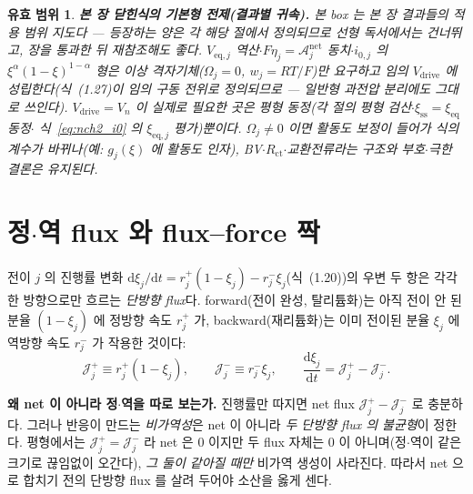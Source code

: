 \documentclass[11pt,a4paper]{article}
\newtheorem*{boundbox}{유효 범위}
\newcommand{\dd}{\mathrm{d}}
\newcommand{\eq}{\mathrm{eq}}
\newcommand{\drive}{\mathrm{drive}}
\newcommand{\sstat}{\mathrm{ss}}
\newcommand{\ct}{\mathrm{ct}}
\begin{document}
\begin{boundbox}
\textbf{본 장 닫힌식의 기본형 전제(결과별 귀속).} 본 box 는 본 장 결과들의 적용 범위 \emph{지도}다 — 등장하는
양은 각 해당 절에서 정의되므로 선형 독서에서는 건너뛰고, 장을 통과한 뒤 재참조해도 좋다. $V_{\eq,j}$ 역산$\cdot$$F\eta_j=\mathcal A_j^{\mathrm{net}}$ 동치$\cdot$$i_{0,j}$ 의 $\xi^{\alpha}(1-\xi)^{1-\alpha}$ 형은 \emph{이상 격자기체}($\Omega_j=0$, $w_j=RT/F$)만 요구하고 임의
$V_\drive$ 에 성립한다(식~(1.27)이 임의 구동 전위로 정의되므로 — 일반형 과전압 분리에도 그대로 쓰인다).
$V_\drive=V_n$ 이 실제로 필요한 곳은 \emph{평형 동정}(각 절의 평형 검산$\cdot$$\xi_\sstat=\xi_{\eq}$ 동정$\cdot$
식~\eqref{eq:nch2_i0} 의 $\xi_{\eq,j}$ 평가)뿐이다. $\Omega_j\ne0$ 이면 활동도 보정이 들어가 식의 \emph{계수}가 바뀌나(예: $g_j(\xi)$ 에
활동도 인자), BV$\cdot$$R_\ct$$\cdot$교환전류라는 \emph{구조}와 부호$\cdot$극한 결론은 유지된다.
\end{boundbox}

\section{정$\cdot$역 flux 와 flux--force 짝}\label{sec:nch2_flux}
전이 $j$ 의 진행률 변화 $\dd\xi_j/\dd t=r_j^+(1-\xi_j)-r_j^-\xi_j$(식~(1.20))의 우변 두 항은 각각 한 방향으로만
흐르는 \emph{단방향 flux}다. forward(전이 완성, 탈리튬화)는 아직 전이 안 된 분율 $(1-\xi_j)$ 에 정방향 속도
$r_j^+$ 가, backward(재리튬화)는 이미 전이된 분율 $\xi_j$ 에 역방향 속도 $r_j^-$ 가 작용한 것이다:
\begin{equation}
\mathcal J_j^+\equiv r_j^+(1-\xi_j),\qquad \mathcal J_j^-\equiv r_j^-\xi_j,\qquad
\frac{\dd\xi_j}{\dd t}=\mathcal J_j^+-\mathcal J_j^-.
\label{eq:nch2_Jpm}
\end{equation}

\textbf{왜 net 이 아니라 정$\cdot$역을 따로 보는가.} 진행률만 따지면 net flux $\mathcal J_j^+-\mathcal J_j^-$ 로
충분하다. 그러나 반응이 만드는 \emph{비가역성}은 net 이 아니라 \emph{두 단방향 flux 의 불균형}이 정한다.
평형에서는 $\mathcal J_j^+=\mathcal J_j^-$ 라 net 은 $0$ 이지만 두 flux 자체는 $0$ 이 아니며(정$\cdot$역이 같은
크기로 끊임없이 오간다), \emph{그 둘이 같아질 때만} 비가역 생성이 사라진다. 따라서 net 으로 합치기 전의 단방향
flux 를 살려 두어야 소산을 옳게 센다.
\end{document}
